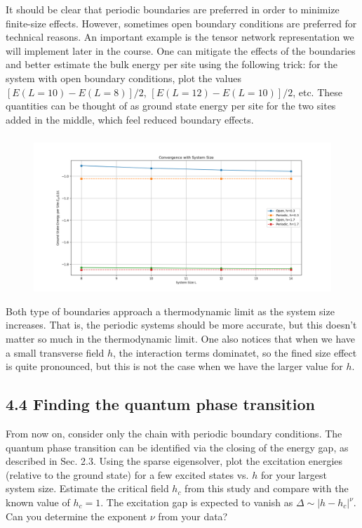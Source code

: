 \documentclass[12pt]{article}
\begin{document}
It should be clear that periodic boundaries are preferred in order to minimize finite-size effects. However, sometimes open boundary conditions are preferred for technical reasons. An important example is the tensor network representation we will implement later in the course. One can mitigate the effects of the boundaries and better estimate the bulk energy per site using the following trick: for the system with open boundary conditions, plot the values $[E(L=10)-E(L=8)] / 2$, $[E(L=12)-E(L=10)] / 2$, etc. These quantities can be thought of as ground state energy per site for the two sites added in the middle, which feel reduced boundary effects.
\subsubsection{}
\begin{figure}
\centering
\includegraphics[width=\textwidth]{convergence.png}
\end{figure}

Both type of boundaries approach a thermodynamic limit as the system size increases. That is, the periodic systems should be more accurate, but this doesn't matter so much in the thermodynamic limit. One also notices that when we have a small transverse field $h$, the interaction terms dominatet, so the fined size effect is quite pronounced, but this is not the case when we have the larger value for $h$.

\subsection*{4.4 Finding the quantum phase transition}
From now on, consider only the chain with periodic boundary conditions. The quantum phase transition can be identified via the closing of the energy gap, as described in Sec. 2.3. Using the sparse eigensolver, plot the excitation energies (relative to the ground state) for a few excited states vs. $h$ for your largest system size. Estimate the critical field $h_{c}$ from this study and compare with the known value of $h_{c}=1$. The excitation gap is expected to vanish as $\Delta \sim\left|h-h_{c}\right|^{\nu}$. Can you determine the exponent $\nu$ from your data?
\end{document}
